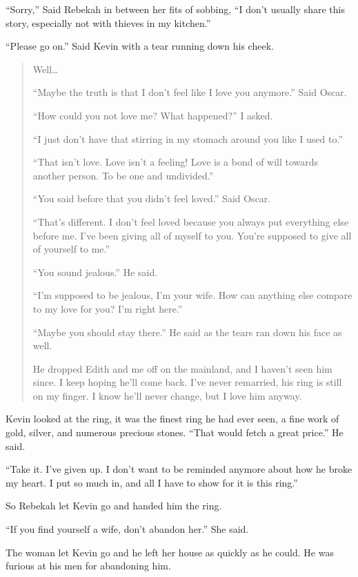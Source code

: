 ``Sorry,'' Said Rebekah in between her fits of sobbing, ``I don't usually share this story, especially not with thieves in my kitchen.''

``Please go on.'' Said Kevin with a tear running down his cheek.

\begin{quote}

Well\ldots

``Maybe the truth is that I don't feel like I love you anymore.'' Said Oscar.

``How could you not love me? What happened?'' I asked.

``I just don't have that stirring in my stomach around you like I used to.''

``That isn't love. Love isn't a feeling! Love is a bond of will towards another person. To be one and undivided.''

``You said before that you didn't feel loved.'' Said Oscar.

``That's different. I don't feel loved because you always put everything else before me. I've been giving all of myself to you. You're supposed to give all of yourself to me.''

``You sound jealous.'' He said.

``I'm supposed to be jealous, I'm your wife. How can anything else compare to my love for you? I'm right here.''

``Maybe you should stay there.'' He said as the tears ran down his face as well.

He dropped Edith and me off on the mainland, and I haven't seen him since. I keep hoping he'll come back. I've never remarried, his ring is still on my finger. I know he'll never change, but I love him anyway.

\end{quote}

Kevin looked at the ring, it was the finest ring he had ever seen, a fine work of gold, silver, and numerous precious stones.
``That would fetch a great price.'' He said.

``Take it. I've given up. I don't want to be reminded anymore about how he broke my heart. I put so much in, and all I have to show for it is this ring.''

So Rebekah let Kevin go and handed him the ring.

``If you find yourself a wife, don't abandon her.'' She said.

The woman let Kevin go and he left her house as quickly as he could. He was furious at his men for abandoning him.

